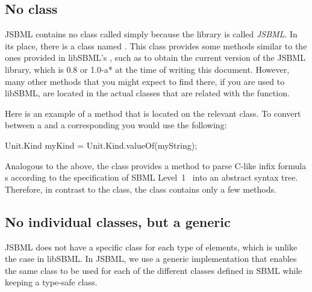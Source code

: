 \subsection{No class }

JSBML contains no class called  simply because the library
is called \emph{JSBML}.  %
In its place, there is a class named .
 This class provides some methods similar
to the ones provided in libSBML's , such as
to obtain the current version of the JSBML library, which is 0.8 or 1.0-a* at the
time of writing this document. However, many other methods that you might
expect to find there, if you are used to libSBML, are located in the actual
classes that are related with the function. 

Here is an example of a method that is located on the relevant class.  To
convert between a \String {}%
and a corresponding 
%
you would use the following:

\begin{example}[title={Converting a string to a unit kind in JSBML.}]
Unit.Kind myKind = Unit.Kind.valueOf(myString);
\end{example}

Analogous to the above, the \ASTNode class provides a method to parse
C-like infix formula {\String}s according to the specification of SBML
Level~1~\citep{Hucka2003} into an abstract syntax
tree. Therefore, in contrast to the  class, the class
 contains only a few methods.


\subsection{No individual  classes, but a generic }


JSBML does not have a specific 
class for each type of \SBase elements, which is unlike the case in
libSBML. In JSBML, we use a generic implementation  that enables the same class to be used for each of the different
 classes defined in SBML while keeping a type-safe class.

